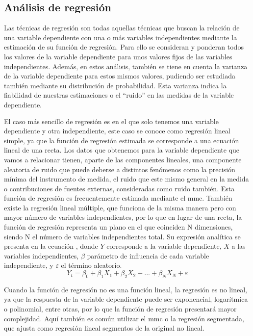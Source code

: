 \subsection{Análisis de regresión}
\par Las técnicas de regresión son todas aquellas técnicas que buscan la relación de una variable dependiente con una o más variables independientes mediante la estimación de su función de regresión. Para ello se consideran y ponderan todos los valores de la variable dependiente para unos valores fijos de las variables independientes. Además, en estos análisis, también se tiene en cuenta la varianza de la variable dependiente para estos mismos valores, pudiendo ser estudiada también mediante su distribución de probabilidad. Esta varianza indica la fiabilidad de nuestras estimaciones o el ``ruido'' en las medidas de la variable dependiente. 
\\
\par El caso más sencillo de regresión es en el que solo tenemos una variable dependiente y otra independiente, este caso se conoce como regresión lineal simple, ya que la función de regresión estimada se corresponde a una ecuación lineal de una recta. Los datos que obtenemos para la variable dependiente que vamos a relacionar tienen, aparte de las componentes lineales, una componente aleatoria de ruido que puede deberse a distintos fenómenos como la precisión mínima del instrumento de medida, el ruido que este mismo general en la medida o contribuciones de fuentes externas, consideradas como ruido también. Esta función de regresión es frecuentemente estimada mediante el \gls{mmc}. También existe la regresión lineal múltiple, que funciona de la misma manera pero con mayor número de variables independientes, por lo que en lugar de una recta, la función de regresión representa un plano en el que coinciden N dimensiones, siendo N el número de variables independientes total. Su expresión analítica se presenta en la ecuación \label{RL}, donde $Y$ corresponde a la variable dependiente, $X$ a las variables independientes, $\beta$ parámetro de influencia de cada variable independiente, y $\varepsilon$ el término aleatorio.
\\
\begin{equation} \label{RL}
Y_{t}=\beta _{0}+\beta _{1} X_{1}+\beta _{2} X_{2}+...+\beta _{N} X_{N}+\varepsilon 
\end{equation}
\par Cuando la función de regresión no es una función lineal, la regresión es no lineal, ya que la respuesta de la variable dependiente puede ser exponencial, logarítmica o polinomial, entre otras, por lo que la función de regresión presentará mayor complejidad. Aquí también es común utilizar el \gls{mmc} o la regresión segmentada, que ajusta como regresión lineal segmentos de la original no lineal.
